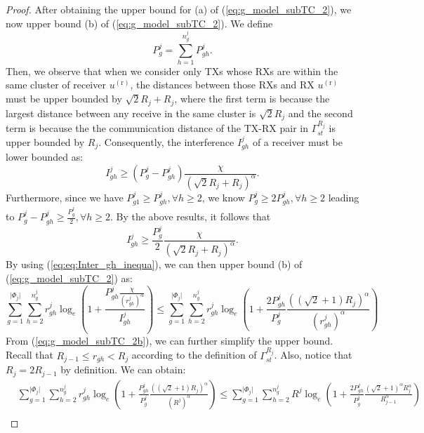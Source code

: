 \documentclass[journal,draftclsnofoot,onecolumn,12pt,twoside]{IEEEtran}
\begin{document}
\begin{proof}
After obtaining the upper bound for (a) of (\ref{eq:g_model_subTC_2}), we now upper bound (b) of (\ref{eq:g_model_subTC_2}). We define
\begin{equation}
P_g^j=\sum_{h=1}^{n_g^j} P_{gh}^j.
\end{equation}
Then, we observe that when we consider only TXs whose RXs are within the same cluster of receiver $u^{(\text{r})}$, the distances between those RXs and RX $u^{(\text{r})}$ must be upper bounded by $\sqrt{2}R_j+R_j$, where the first term is because the largest distance between any receive in the same cluster is $\sqrt{2}R_j$ and the second term is because the the communication distance of the TX-RX pair in $\Gamma_{st}^{R_j}$ is upper bounded by $R_j$. Consequently, the interference $I_{gh}^j$ of a receiver must be lower bounded as:
\begin{equation}
I_{gh}^j\geq (P_g^j-P_{gh}^j)\frac{\chi}{(\sqrt{2}R_j+R_j)^{\alpha}}.
\end{equation}
Furthermore, since we have $P_{g1}^j\geq P_{gh}^j,\forall h\geq 2$, we know $P_g^j\geq 2 P_{gh}^j,\forall h\geq 2$ leading to $P_g^j-P_{gh}^j\geq \frac{P_g^j}{2},\forall h\geq 2$. By the above results, it follows that 
\begin{equation}\label{eq:eq:Inter_gh_inequa}
I_{gh}^j\geq \frac{P_g^j}{2}\frac{\chi}{(\sqrt{2}R_j+R_j)^{\alpha}}.
\end{equation}
By using (\ref{eq:eq:Inter_gh_inequa}), we can then upper bound (b) of (\ref{eq:g_model_subTC_2}) as:
\begin{equation}\label{eq:g_model_subTC_2b}
\sum_{g=1}^{\vert\Phi_j\vert}\sum_{h=2}^{n_g^j} r_{gh}^j\log_e\left(1+\frac{P_{gh}^j\frac{\chi}{(r_{gh}^j)^{\alpha}}}{I_{gh}^j}\right)\leq \sum_{g=1}^{\vert\Phi_j\vert}\sum_{h=2}^{n_g^j} r_{gh}^j\log_e\left(1+\frac{2P_{gh}^j}{P_g^j}\frac{((\sqrt{2}+1)R_j)^{\alpha}}{(r_{gh}^j)^{\alpha}}\right)
\end{equation}
From (\ref{eq:g_model_subTC_2b}), we can further simplify the upper bound. Recall that $R_{j-1}\leq r_{gh}< R_j$ according to the definition of $\Gamma_{st}^{R_j}$. Also, notice that $R_j=2R_{j-1}$ by definition. We can obtain:
\begin{equation}
\begin{aligned}\label{eq:g_model_subTC_termB}
&\sum_{g=1}^{\vert\Phi_j\vert}\sum_{h=2}^{n_g^j} r_{gh}^j\log_e\left(1+\frac{P_{gh}^j}{P_g^j}\frac{((\sqrt{2}+1)R_j)^{\alpha}}{(R^j)^{\alpha}}\right)\leq  \sum_{g=1}^{\vert\Phi_j\vert}\sum_{h=2}^{n_g^j}R^j\log_e\left(1+\frac{2P_{gh}^j}{P_g^j}\frac{(\sqrt{2}+1)^{\alpha}R_j^{\alpha}}{R_{j-1}^{\alpha}}\right)\\

\end{aligned}
\end{equation}
\end{proof}
\end{document}
